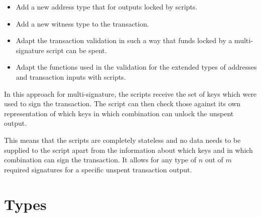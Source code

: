 \documentclass[11pt,a4paper,dvipsnames]{article}
\theoremstyle{definition}
\begin{document}
\begin{itemize}
\item Add a new address type that for outputs locked by scripts.
\item Add a new witness type to the transaction.
\item Adapt the transaction validation in such a way that funds locked by a
  multi-signature script can be spent.
\item Adapt the functions used in the validation for the extended types of
  addresses and transaction inputs with scripts.
\end{itemize}

In this approach for multi-signature, the scripts receive the set of keys which
were used to sign the transaction. The script can then check those against its
own representation of which keys in which combination can unlock the unspent
output.

This means that the scripts are completely stateless and no data needs to be
supplied to the script apart from the information about which keys and in which
combination can sign the transaction. It allows for any type of $n$ out of $m$
required signatures for a specific unspent transaction output.

\section{Types}
\label{sec:types}
\end{document}

